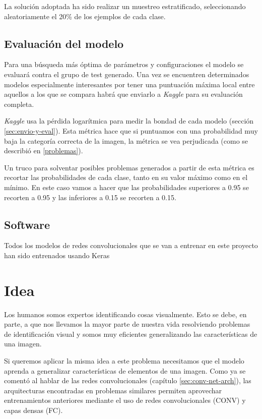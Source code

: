 La solución adoptada ha sido realizar un muestreo estratificado, seleccionando aleatoriamente el 20\% de los ejemplos de cada clase.

\subsection{Evaluación del modelo}

Para una búsqueda más óptima de parámetros y configuraciones el modelo se evaluará contra el grupo de test generado. Una vez se encuentren determinados modelos especialmente interesantes por tener una puntuación máxima local entre aquellos a los que se compara habrá que enviarlo a \textit{Kaggle} para su evaluación completa.

\textit{Kaggle} usa la pérdida logarítmica para medir la bondad de cada modelo (sección 
\ref{sec:envio-y-eval}). Esta métrica hace que si puntuamos con una probabilidad muy baja la categoría correcta de la imagen, la métrica se vea perjudicada (como se describió en \ref{problemas}).

Un truco para solventar posibles problemas generados a partir de esta métrica es recortar las probabilidades de cada clase, tanto en su valor máximo como en el mínimo. En este caso vamos a hacer que las probabilidades superiores a 0.95 se recorten a 0.95 y las inferiores a 0.15 se recorten a 0.15.


\subsection{Software}

Todos los modelos de redes convolucionales que se van a entrenar en este proyecto han sido entrenados usando Keras


\section{Idea}

Los humanos somos expertos identificando cosas visualmente. Esto se debe, en
parte, a que nos llevamos la mayor parte de nuestra vida resolviendo problemas
de identificación visual y somos muy eficientes generalizando las
características de una imagen.

Si queremos aplicar la misma idea a este problema necesitamos que el modelo
aprenda a generalizar características de elementos de una imagen.  Como ya se
comentó al hablar de las redes convolucionales (capítulo
\ref{sec:conv-net-arch}), las arquitecturas encontradas en problemas similares
\parencite{krizhevsky2012imagenet} permiten aprovechar entrenamientos
anteriores mediante el uso de redes convolucionales (CONV) y capas densas (FC).

